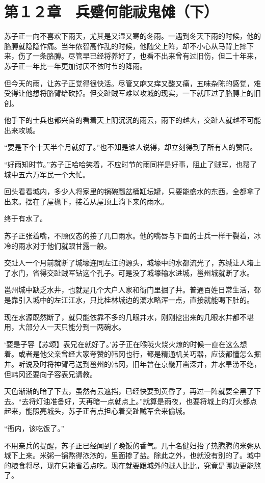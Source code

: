 \section{第１２章　兵蹙何能祓鬼傩（下）}

苏子正一向不喜欢下雨天，尤其是又湿又寒的冬雨。一遇到冬天下雨的时候，他的胳膊就隐隐作痛。当年侬智高作乱的时候，他随父上阵，却不小心从马背上摔下来，伤了一条胳膊。尽管早已经将养好了，也看不出来曾有过旧伤，但二十年来，苏子正一年比一年更加讨厌不依时节的降雨。

但今天的雨，让苏子正觉得很快活。尽管又麻又痒又酸又痛，五味杂陈的感觉，难受得让他想将胳臂给砍掉。但交趾贼军难以攻城的现实，一下就压过了胳膊上的旧创。

他手下的士兵也都兴奋的看着天上阴沉沉的雨云，雨下的越大，交趾人就越不可能出来攻城。

“要是下个十天半个月就好了。”也不知是谁人说得，却立刻得到了所有人的赞同。

“好雨知时节。”苏子正哈哈笑着，不应时节的雨同样是好事，阻止了贼军，也帮了城中五六万军民一个大忙。

回头看看城内，多少人将家里的锅碗瓢盆桶缸坛罐，只要能盛水的东西，全都拿了出来。摆在了屋檐下，接着从屋顶上淌下来的雨水。

终于有水了。

苏子正张着嘴，不顾仪态的接了几口雨水。他的嘴唇与下面的士兵一样干裂着，冰冷的雨水对于他们就跟甘露一般。

交趾人一个月前就断了城壕连同左江的源头，城壕中的水都流光了，苏缄让人堵上了水门，省得交趾贼军钻这个孔子。可是没了城壕输水进城，邕州城就断了水。

邕州城中缺乏水井，也就是几个大户人家和衙门里掘了井。普通百姓日常生活，都是靠引入城中的左江江水，只比桂林城边的漓水略浑一点，直接就能喝下肚的。

现在水源既然断了，就只能依靠不多的几眼井水，刚刚挖出来的几眼水井都不堪用，大部分人一天只能分到一两碗水。

‘要是子容【苏颂】表兄在就好了。’苏子正在喉咙火烧火燎的时候一直在这么想着。或者是他父亲曾经大家夸赞的韩冈也行，都是精通机关巧器，应该都懂怎么掘井。听说及时将神臂弓送到邕州的韩冈，旧年曾在京畿开凿深井，井水旱涝不绝，但韩冈还要向子容表兄请教。

天色渐渐的暗了下去，虽然有云遮挡，已经快要到黄昏了，再过一阵就要全黑了下去。“去将灯油准备好，天再暗一点就点上。”就算是雨夜，也要将城上的灯火都点起来，能照亮城头，苏子正有点担心着交趾贼军会来偷城。

“衙内，该吃饭了。”

不用亲兵的提醒，苏子正已经闻到了晚饭的香气。几十名健妇抬了热腾腾的米粥从城下上来。米粥一锅熬得浓浓的，里面掺了盐。除此之外，也就没有别的了。城中的粮食将尽，现在只能省着点吃。现在就要跟城外的贼人比比，究竟是哪边更能熬了。

